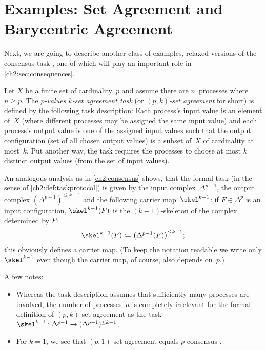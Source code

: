 \section{Examples: Set Agreement and Barycentric Agreement}
Next, we are going to describe another class of examples, relaxed versions of
the consensus task , one of which will play an important
role in \cref{ch2:sec:consequences}.

\begin{thExample}
    \label{ch2:setagreement}
    Let $X$ be a finite set of cardinality~$p$ and assume there are
    $n$~processes where $n\geq p$.  The \emph{$p$-values $k$-set
    agreement task} (or \emph{$(p,k)$-set agreement} for short) is
    defined by the following task description:
    Each process's input value is an element of~$X$ (where different
    processes may be assigned the same input value) and each process's
    output value is one of the assigned input values such that
    the output configuration (set of all chosen output values)
    is a subset of~$X$ of cardinality at most~$k$. Put another way,
    the task requires the processes to choose at most $k$ distinct
    output values (from the set of input values).
    
    An analogous analysis as in \cref{ch2:consensus} shows, that
    the formal task (in the sense of \cref{ch2:def:taskprotocol})
    is given by the input complex~$\Delta^{p-1}$, the output complex
    $(\Delta^{p-1})^{\leq k-1}$ and the following carrier map~$\skel^{k-1}$:
    if $F\in\Delta^p$ is an input configuration, $\skel^{k-1}(F)$ is the
    $(k{-}1)$-skeleton of the complex determined by $F$:
    \[ \skel^{k-1}(F) \defeq \bigl(\Delta^{p-1}(F)\bigr)^{\leq k-1}
    ; \]
    this obviously defines a carrier map. (To keep the notation
    readable we write only $\skel^{k-1}$ even though the carrier map,
    of course, also depends on~$p$.)
    
    A few notes:
    \begin{itemize}
        \item
            Whereas the task description assumes that sufficiently many
            processes are involved, the number of processes~$n$ is completely
            irrelevant for the formal definition of $(p,k)$-set agreement
            as the task
            $\skel^{k-1}\colon\Delta^{p-1}\to(\Delta^{p-1})^{\leq k-1}$.
            
        \item
            For $k=1$, we see that $(p,1)$-set agreement equals $p$-consensus
            .
            

\end{itemize}
\end{thExample}
